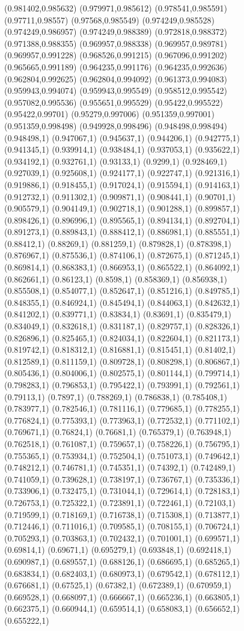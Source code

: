 \documentclass[conference]{IEEEtran}
\begin{document}
\begin{figure}[t]
(0.981402,0.985632) (0.979971,0.985612) (0.978541,0.985591) (0.97711,0.98557) (0.97568,0.985549) (0.974249,0.985528) (0.974249,0.986957) (0.974249,0.988389) (0.972818,0.988372) (0.971388,0.988355) (0.969957,0.988338) (0.969957,0.989781) (0.969957,0.991228) (0.968526,0.991215) (0.967096,0.991202) (0.965665,0.991189) (0.964235,0.991176) (0.964235,0.992636) (0.962804,0.992625) (0.962804,0.994092) (0.961373,0.994083) (0.959943,0.994074) (0.959943,0.995549) (0.958512,0.995542) (0.957082,0.995536) (0.955651,0.995529) (0.95422,0.995522) (0.95422,0.99701) (0.95279,0.997006) (0.951359,0.997001) (0.951359,0.998498) (0.949928,0.998496) (0.948498,0.998494) (0.948498,1) (0.947067,1) (0.945637,1) (0.944206,1) (0.942775,1) (0.941345,1) (0.939914,1) (0.938484,1) (0.937053,1) (0.935622,1) (0.934192,1) (0.932761,1) (0.93133,1) (0.9299,1) (0.928469,1) (0.927039,1) (0.925608,1) (0.924177,1) (0.922747,1) (0.921316,1) (0.919886,1) (0.918455,1) (0.917024,1) (0.915594,1) (0.914163,1) (0.912732,1) (0.911302,1) (0.909871,1) (0.908441,1) (0.90701,1) (0.905579,1) (0.904149,1) (0.902718,1) (0.901288,1) (0.899857,1) (0.898426,1) (0.896996,1) (0.895565,1) (0.894134,1) (0.892704,1) (0.891273,1) (0.889843,1) (0.888412,1) (0.886981,1) (0.885551,1) (0.88412,1) (0.88269,1) (0.881259,1) (0.879828,1) (0.878398,1) (0.876967,1) (0.875536,1) (0.874106,1) (0.872675,1) (0.871245,1) (0.869814,1) (0.868383,1) (0.866953,1) (0.865522,1) (0.864092,1) (0.862661,1) (0.86123,1) (0.8598,1) (0.858369,1) (0.856938,1) (0.855508,1) (0.854077,1) (0.852647,1) (0.851216,1) (0.849785,1) (0.848355,1) (0.846924,1) (0.845494,1) (0.844063,1) (0.842632,1) (0.841202,1) (0.839771,1) (0.83834,1) (0.83691,1) (0.835479,1) (0.834049,1) (0.832618,1) (0.831187,1) (0.829757,1) (0.828326,1) (0.826896,1) (0.825465,1) (0.824034,1) (0.822604,1) (0.821173,1) (0.819742,1) (0.818312,1) (0.816881,1) (0.815451,1) (0.81402,1) (0.812589,1) (0.811159,1) (0.809728,1) (0.808298,1) (0.806867,1) (0.805436,1) (0.804006,1) (0.802575,1) (0.801144,1) (0.799714,1) (0.798283,1) (0.796853,1) (0.795422,1) (0.793991,1) (0.792561,1) (0.79113,1) (0.7897,1) (0.788269,1) (0.786838,1) (0.785408,1) (0.783977,1) (0.782546,1) (0.781116,1) (0.779685,1) (0.778255,1) (0.776824,1) (0.775393,1) (0.773963,1) (0.772532,1) (0.771102,1) (0.769671,1) (0.76824,1) (0.76681,1) (0.765379,1) (0.763948,1) (0.762518,1) (0.761087,1) (0.759657,1) (0.758226,1) (0.756795,1) (0.755365,1) (0.753934,1) (0.752504,1) (0.751073,1) (0.749642,1) (0.748212,1) (0.746781,1) (0.745351,1) (0.74392,1) (0.742489,1) (0.741059,1) (0.739628,1) (0.738197,1) (0.736767,1) (0.735336,1) (0.733906,1) (0.732475,1) (0.731044,1) (0.729614,1) (0.728183,1) (0.726753,1) (0.725322,1) (0.723891,1) (0.722461,1) (0.72103,1) (0.719599,1) (0.718169,1) (0.716738,1) (0.715308,1) (0.713877,1) (0.712446,1) (0.711016,1) (0.709585,1) (0.708155,1) (0.706724,1) (0.705293,1) (0.703863,1) (0.702432,1) (0.701001,1) (0.699571,1) (0.69814,1) (0.69671,1) (0.695279,1) (0.693848,1) (0.692418,1) (0.690987,1) (0.689557,1) (0.688126,1) (0.686695,1) (0.685265,1) (0.683834,1) (0.682403,1) (0.680973,1) (0.679542,1) (0.678112,1) (0.676681,1) (0.67525,1) (0.67382,1) (0.672389,1) (0.670959,1) (0.669528,1) (0.668097,1) (0.666667,1) (0.665236,1) (0.663805,1) (0.662375,1) (0.660944,1) (0.659514,1) (0.658083,1) (0.656652,1) (0.655222,1) 
\end{figure}
\end{document}
